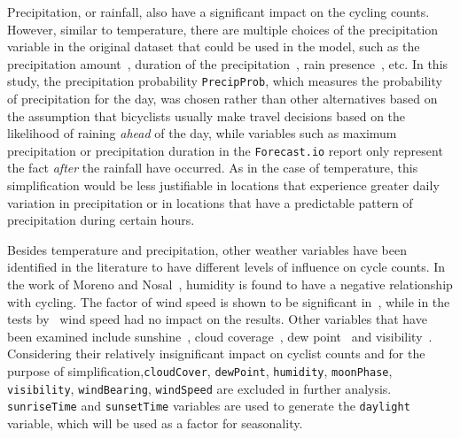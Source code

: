 \documentclass [11pt, proquest] {uwthesis}[2015/03/03]
\begin{document}
Precipitation, or rainfall, also have a significant impact on the cycling counts. However, similar to temperature, there are multiple choices of the precipitation variable in the original dataset that could be used in the model, such as the precipitation amount~\cite{Ahmed12}, duration of the precipitation~\cite{Thomas09}, rain presence~\cite{Miranda-Moreno:2011aa}, etc. In this study, the precipitation probability \texttt{PrecipProb}, which measures the probability of precipitation for the day, was chosen rather than other alternatives based on the assumption that bicyclists usually make travel decisions based on the likelihood of raining \emph{ahead} of the day, while variables such as maximum precipitation or precipitation duration in the \texttt{Forecast.io} report only represent the fact \emph{after} the rainfall have occurred. As in the case of temperature, this simplification would be less justifiable in locations that experience greater daily variation in precipitation or in locations that have a predictable pattern of precipitation during certain hours.

Besides temperature and precipitation, other weather variables have been identified in the literature to have different levels of influence on cycle counts. In the work of Moreno and Nosal~\cite{Miranda-Moreno:2011aa}, humidity is found to have a negative relationship with cycling. The factor of wind speed is shown to be significant in~\cite{Thomas12}, while in the tests by~\cite{Miranda-Moreno:2011aa} wind speed had no impact on the results. Other variables that have been examined include sunshine~\cite{Thomas12}, cloud coverage~\cite{Hanson77}, dew point~\cite{Schade14,Nosal:2014aa} and visibility~\cite{Thomas09}. Considering their relatively insignificant impact on cyclist counts and for the purpose of simplification,\texttt{cloudCover}, \texttt{dewPoint}, \texttt{humidity}, \texttt{moonPhase}, \texttt{visibility}, \texttt{windBearing}, \texttt{windSpeed} are excluded in further analysis. \texttt{sunriseTime} and \texttt{sunsetTime} variables are used to generate the \texttt{daylight} variable, which will be used as a factor for seasonality.
\end{document}
